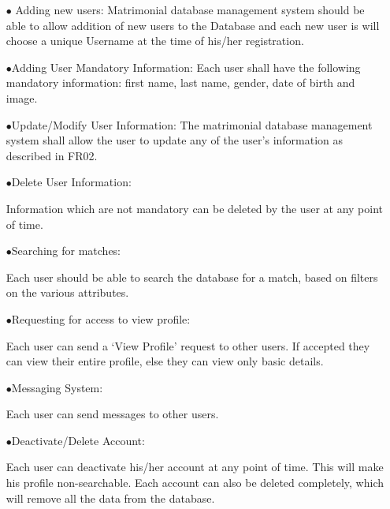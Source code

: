 \documentclass[12pt]{report}
\begin{document}
\begin{itemize}

\item[$\bullet$ Adding new users:] Matrimonial database management system should be able to allow addition of new users to the Database and each new user is will choose a unique Username at the time of his/her registration.
 
 
\item [$\bullet$Adding User Mandatory Information:]
Each user shall have the following mandatory information: first name, last name, gender, date of birth and image. 

\item [$\bullet$Update/Modify User Information:]
The matrimonial database management system shall allow the user to update any of the user’s information as described in FR02. 

\item [$\bullet$Delete User Information:] 

Information which are not mandatory can be deleted by the user at any point of time. 

\item [$\bullet$Searching for matches:] 

Each user should be able to search the database for a match, based on filters on the various attributes. 

\item [$\bullet$Requesting for access to view profile:]

Each user can send a ‘View Profile’ request to other users. If accepted they can view their entire profile, else they can view only basic details. 

\item [$\bullet$Messaging System:] 

Each user can send messages to other users. 

\item [$\bullet$Deactivate/Delete Account:] 

Each user can deactivate his/her account at any point of time. This will make his profile non-searchable. 
Each account can also be deleted completely, which will remove all the data from the database. 

\end{itemize} 
\end{document}
